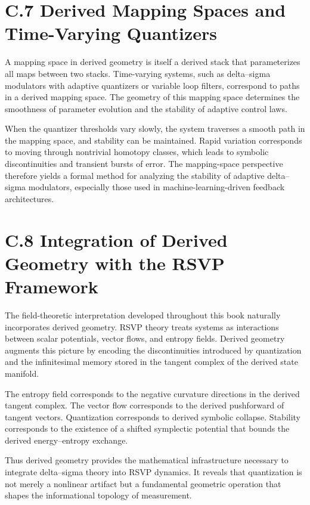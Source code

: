 \section{C.7 Derived Mapping Spaces and Time-Varying Quantizers}

A mapping space in derived geometry is itself a derived stack that parameterizes all maps between two stacks. Time-varying systems, such as delta–sigma modulators with adaptive quantizers or variable loop filters, correspond to paths in a derived mapping space. The geometry of this mapping space determines the smoothness of parameter evolution and the stability of adaptive control laws.

When the quantizer thresholds vary slowly, the system traverses a smooth path in the mapping space, and stability can be maintained. Rapid variation corresponds to moving through nontrivial homotopy classes, which leads to symbolic discontinuities and transient bursts of error. The mapping-space perspective therefore yields a formal method for analyzing the stability of adaptive delta–sigma modulators, especially those used in machine-learning-driven feedback architectures.

\section{C.8 Integration of Derived Geometry with the RSVP Framework}

The field-theoretic interpretation developed throughout this book naturally incorporates derived geometry. RSVP theory treats systems as interactions between scalar potentials, vector flows, and entropy fields. Derived geometry augments this picture by encoding the discontinuities introduced by quantization and the infinitesimal memory stored in the tangent complex of the derived state manifold.

The entropy field corresponds to the negative curvature directions in the derived tangent complex. The vector flow corresponds to the derived pushforward of tangent vectors. Quantization corresponds to derived symbolic collapse. Stability corresponds to the existence of a shifted symplectic potential that bounds the derived energy–entropy exchange.

Thus derived geometry provides the mathematical infrastructure necessary to integrate delta–sigma theory into RSVP dynamics. It reveals that quantization is not merely a nonlinear artifact but a fundamental geometric operation that shapes the informational topology of measurement.
